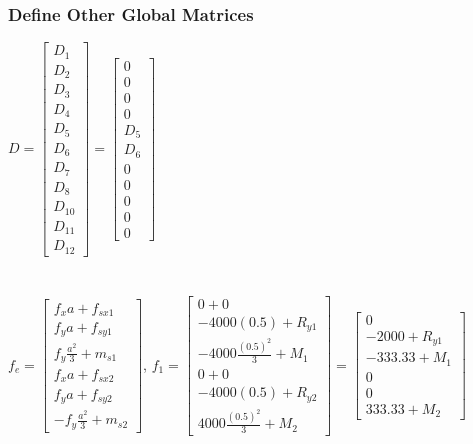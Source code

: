 \documentclass{article}
\begin{document}
\subsubsection*{Define Other Global Matrices}
$D=\begin{bmatrix}
    D_1 \\ D_2 \\ D_3 \\ D_4 \\ D_5 \\ D_6 \\ D_7 \\ D_8 \\ D_{10} \\
    D_{11} \\ D_{12}
\end{bmatrix}=\begin{bmatrix}
    0 \\ 0 \\ 0 \\ 0 \\ D_5 \\ D_6 \\ 0 \\ 0 \\ 0 \\ 0 \\ 0
\end{bmatrix}$ \\\\\\
$f_e=\begin{bmatrix}
    f_xa + f_{sx1} \\ f_ya + f_{sy1} \\ f_y\frac{a^2}{3}+m_{s1} \\
    f_xa + f_{sx2} \\ f_ya + f_{sy2} \\ -f_y\frac{a^2}{3}+m_{s2}
\end{bmatrix}$, \quad $f_1=\begin{bmatrix}
    0 + 0 \\ -4000(0.5) + R_{y1} \\ -4000\frac{(0.5)^2}{3} + M_1 \\
    0 + 0 \\ -4000(0.5) + R_{y2} \\ 4000\frac{(0.5)^2}{3} + M_2
\end{bmatrix}=\begin{bmatrix}
    0 \\ -2000+R_{y1} \\ -333.33+M_1 \\ 0 \\ 0 \\ 333.33+M_2
\end{bmatrix}$ \\\\\\
\end{document}
